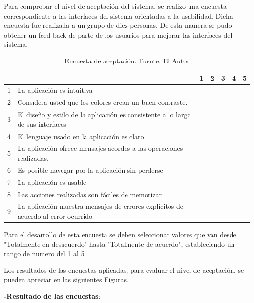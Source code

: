Para comprobar el nivel de aceptación del sistema, se realizo una encuesta correspondiente a las interfaces del sistema orientadas a la usabilidad. Dicha encuesta fue realizada a un grupo de diez personas. De esta manera se pudo obtener un feed back de parte de los usuarios para mejorar las interfaces del sistema.



\begin{table}[H]	
\begin{center}
\begin{tabular}{ | m{1cm} | m{8cm}| m{1cm}|m{1cm}| m{1cm} | m{1cm}| m{1cm}| } 
 \hline
 \multicolumn{2}{|c|}{} & 1 & 2 & 3 & 4 & 5 \\
 \hline
 1 & La aplicación es intuitiva & & & & & \\
 \hline
 2 & Considera usted que los colores crean un buen contraste. & & & & & \\
 \hline
 3 & El diseño y estilo de la aplicación es consistente a lo largo de sus interfaces & & & & & \\
 \hline
 4 & El lenguaje usado en la aplicación es claro & & & & & \\
 \hline
 5 & La aplicación ofrece mensajes acordes a las operaciones realizadas. & & & & & \\
 \hline
 6 & Es posible navegar por la aplicación sin perderse & & & & & \\
 \hline
 7 & La aplicación es usable & & & & & \\
 \hline
 8 & Las acciones realizadas son fáciles de memorizar & & & & & \\
 \hline
 9 & La aplicación muestra mensajes de errores explícitos de acuerdo al error ocurrido & & & & & \\
 \hline
\end{tabular}
\caption{Encuesta de aceptación. Fuente: El Autor}
\label{Tabla:8}
\end{center}
\end{table}	


Para el desarrollo de esta encuesta se deben seleccionar valores que van desde "Totalmente en desacuerdo" hasta "Totalmente de acuerdo", estableciendo un rango de numero del 1 al 5.

Los resultados de las encuestas aplicadas, para evaluar el nivel de aceptación, se pueden apreciar en las siguientes Figuras.

\newpage
\textbf{-Resultado de las encuestas}: 


